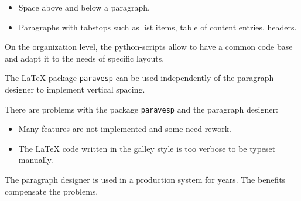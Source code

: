 \documentclass[]{ltugboat}
\begin{document}
\begin{itemize}
\item Space above and below a paragraph.
\item Paragraphs with tabstops such as list items, table of content entries, headers.
\end{itemize}

On the organization level, the python-scripts allow to have a common code base and adapt it to the needs of specific layouts.

The \LaTeX{} package \verb|paravesp| can be used independently of the paragraph designer to implement vertical spacing.

There are problems with the package \verb|paravesp| and the paragraph designer:

\begin{itemize}
\item Many features are not implemented and some need rework.
\item The \LaTeX{} code written in the galley style is too verbose to be typeset manually.
\end{itemize}

The paragraph designer is used in a production system for years. The benefits compensate the problems.
\end{document}
